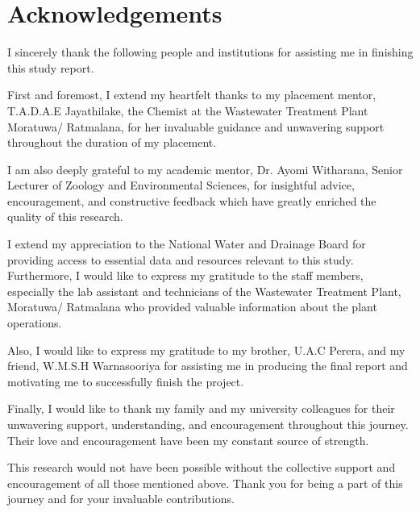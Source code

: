 \newpage
\section*{\centering Acknowledgements}

I sincerely thank the following people and institutions for assisting me in finishing this study report.

First and foremost, I extend my heartfelt thanks to my placement mentor, T.A.D.A.E Jayathilake, the Chemist at the Wastewater Treatment Plant Moratuwa/ Ratmalana, for her invaluable guidance and unwavering support throughout the duration of my placement.

I am also deeply grateful to my academic mentor, Dr. Ayomi Witharana, Senior Lecturer of Zoology and Environmental Sciences, for insightful advice, encouragement, and constructive feedback which have greatly enriched the quality of this research.

I extend my appreciation to the National Water and Drainage Board for providing access to essential data and resources relevant to this study. Furthermore, I would like to express my gratitude to the staff members, especially the lab assistant and technicians of the Wastewater Treatment Plant, Moratuwa/ Ratmalana who provided valuable information about the plant operations.

Also, I would like to express my gratitude to my brother, U.A.C Perera, and my friend, W.M.S.H Warnasooriya for assisting me in producing the final report and motivating me to successfully finish the project.

Finally, I would like to thank my family and my university colleagues for their unwavering support, understanding, and encouragement throughout this journey. Their love and encouragement have been my constant source of strength.

This research would not have been possible without the collective support and encouragement of all those mentioned above. Thank you for being a part of this journey and for your invaluable contributions.

\clearpage